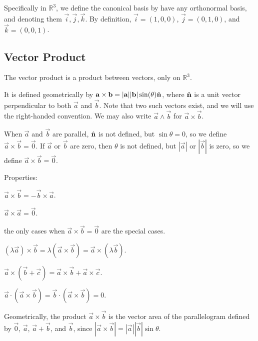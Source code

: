 \documentclass[12pt]{article}
\begin{document}
Specifically in $\mathbb{R}^{3}$, we define the 
canonical basis by have any orthonormal basis,
and denoting them $\vec{i}, \vec{j}, \vec{k}$. By definition,
$\vec{i} = (1,0,0)$, $\vec{j} = (0,1,0)$, and $\vec{k} = (0,0,1)$.

\subsection{Vector Product}

The vector product is a product between vectors,
only on $\mathbb{R}^{3}$.

It is defined geometrically by 
$\mathbf{a}\times\mathbf{b} = |\mathbf{a}||\mathbf{b}|\sin(\theta) \hat{\mathbf{n}}$,
where $\hat{\mathbf{n}}$ is a unit vector perpendicular to both $\vec{a}$ and $\vec{b}$.
Note that two such vectors exist, and we will use the right-handed convention.
We may also write $\vec{a}\wedge\vec{b}$ for $\vec{a}\times\vec{b}$.

When $\vec{a}$ and $\vec{b}$ are parallel,
$\hat{\mathbf{n}}$ is not defined, but
$\sin\theta = 0$, so we define $\vec{a}\times\vec{b} = \vec{0}$.
If $\vec{a}$ or $\vec{b}$ are zero,
then $\theta $ is not defined, but $|\vec{a}|$ or $|\vec{b}|$ is zero,
so we define $\vec{a}\times\vec{b} = \vec{0}$.

Properties:
\begin{compactitem}
\item $\vec{a}\times\vec{b} = -\vec{b}\times\vec{a}$.
\item $\vec{a}\times\vec{a} = \vec{0}$.
\item the only cases when $\vec{a}\times\vec{b} = \vec{0}$ are the special cases.
\item $(\lambda \vec{a})\times\vec{b} = \lambda (\vec{a}\times\vec{b}) = \vec{a}\times(\lambda \vec{b})$.
\item $\vec{a}\times(\vec{b}+\vec{c}) = \vec{a}\times\vec{b} + \vec{a}\times\vec{c}$.
\item $\vec{a}\cdot(\vec{a}\times\vec{b}) = \vec{b}\cdot(\vec{a}\times\vec{b}) = 0$.
\end{compactitem}

Geometrically, the product $\vec{a}\times\vec{b}$ is the
vector area of the parallelogram defined by 
$\vec{0}$, $\vec{a}$, $\vec{a}+\vec{b}$, and $\vec{b}$,
since $|\vec{a}\times\vec{b}| = |\vec{a}||\vec{b}|\sin\theta $.
\end{document}
